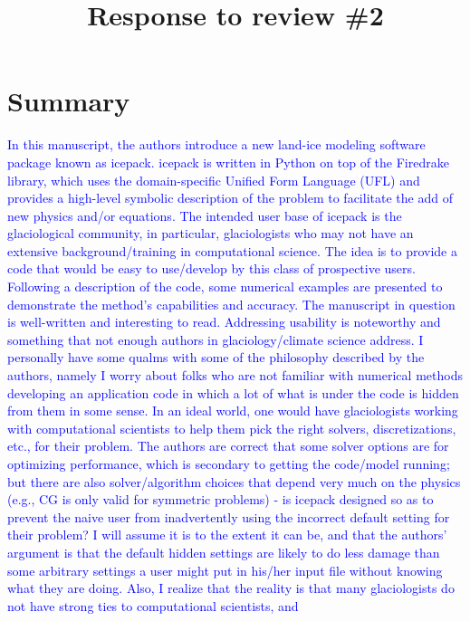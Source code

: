 \documentclass{article}
\theoremstyle{definition}
\theoremstyle{plain}
\begin{document}
\title{Response to review \#2}
\author{}
\date{}

\maketitle

\section*{Summary}

\textcolor{blue}{In this manuscript, the authors introduce a new land-ice modeling software package known as icepack.
icepack is written in Python on top of the Firedrake library, which uses the domain-specific Unified Form
Language (UFL) and provides a high-level symbolic description of the problem to facilitate the add of new
physics and/or equations. The intended user base of icepack is the glaciological community, in particular,
glaciologists who may not have an extensive background/training in computational science. The idea is to
provide a code that would be easy to use/develop by this class of prospective users. Following a description
of the code, some numerical examples are presented to demonstrate the method’s capabilities and accuracy.
The manuscript in question is well-written and interesting to read. Addressing usability is noteworthy
and something that not enough authors in glaciology/climate science address. I personally have some
qualms with some of the philosophy described by the authors, namely I worry about folks who are not
familiar with numerical methods developing an application code in which a lot of what is under the
code is hidden from them in some sense. In an ideal world, one would have glaciologists working with
computational scientists to help them pick the right solvers, discretizations, etc., for their problem. The
authors are correct that some solver options are for optimizing performance, which is secondary to getting
the code/model running; but there are also solver/algorithm choices that depend very much on the physics
(e.g., CG is only valid for symmetric problems) - is icepack designed so as to prevent the naive user from
inadvertently using the incorrect default setting for their problem? I will assume it is to the extent it can
be, and that the authors’ argument is that the default hidden settings are likely to do less damage than
some arbitrary settings a user might put in his/her input file without knowing what they are doing. Also,
I realize that the reality is that many glaciologists do not have strong ties to computational scientists, and
}
\end{document}
